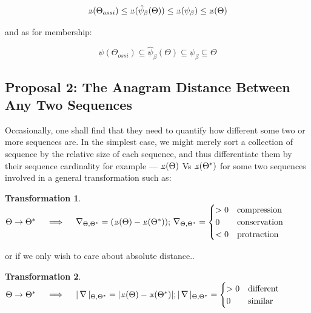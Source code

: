 \documentclass[a4paper, 18pt]{book} %
\newcommand{\invdel}[1]{\mathop{\rotatebox[origin=c]{180}{$\Delta$}}#1}
\newtheorem{trans}{Transformation}
\newcommand{\invpi}{\rotatebox[origin=c]{180}{$\pi$}}
\begin{document}
\vspace{1em}
\begin{equation}
\invpi(\Theta_{ossi}) \leq  \invpi(\hat{\psi}_\beta(\Theta)) \leq \invpi(\psi_\beta) \leq  \invpi(\Theta)
\end{equation}
\vspace{1em}

and as for membership:

\vspace{1em}
\begin{equation}
\psi(\Theta_{ossi}) \subseteq  \hat{\psi}_\beta(\Theta) \subseteq \psi_\beta \subseteq  \Theta
\end{equation}
\vspace{1em}


\subsection{Proposal 2: The Anagram Distance Between Any Two Sequences\cite{adtpaper}}
\label{PROP2}

Occasionally, one shall find that they need to quantify how different some two or more sequences are. In the simplest case, we might merely sort a collection of sequence by the relative size of each sequence, and thus differentiate them by their sequence cardinality for example --- $\invpi(\Theta)$ Vs $\invpi(\Theta^*)$ for some two sequences involved in a general transformation such as:

\vspace{1em}
\begin{trans}
\label{TRANS1b}
$\Theta \rightarrow \Theta^* \quad \implies \quad \invdel_{\Theta,\Theta^*} = (\invpi(\Theta) - \invpi(\Theta^*));\\
\invdel_{\Theta,\Theta^*} = \begin{cases}
> 0 & \text{compression}\\
 0 & \text{conservation}\\
 < 0 & \text{protraction}
 \end{cases}
$
\end{trans}
\vspace{1em}

or if we only wish to care about absolute distance..

\vspace{1em}
\begin{trans}
\label{TRANS1Ab}
$\Theta \rightarrow \Theta^* \quad \implies \quad |\invdel|_{\Theta,\Theta^*} = |\invpi(\Theta) - \invpi(\Theta^*)|;\\
|\invdel|_{\Theta,\Theta^*} = \begin{cases}
> 0 & \text{different}\\
 0 & \text{similar}\\
 \end{cases}
$
\end{trans}
\vspace{1em}
\end{document}
